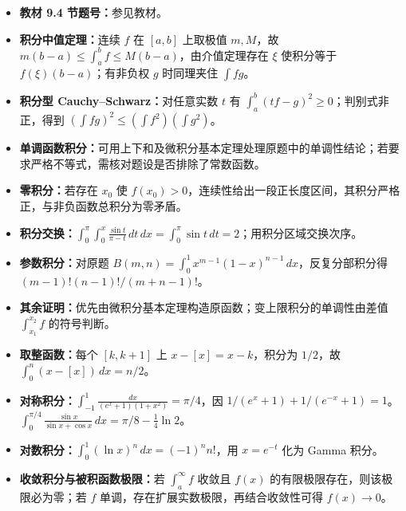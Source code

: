 \begin{itemize}
\item \textbf{教材 9.4 节题号：}参见教材。
\item \textbf{积分中值定理：}连续 $f$ 在 $[a,b]$ 上取极值 $m,M$，故 $m(b-a)\le\int_a^b f\le M(b-a)$，由介值定理存在 $\xi$ 使积分等于 $f(\xi)(b-a)$；有非负权 $g$ 时同理夹住 $\int fg$。
\item \textbf{积分型 Cauchy--Schwarz：}对任意实数 $t$ 有 $\int_a^b(tf-g)^2\ge0$；判别式非正，得到 $(\int fg)^2\le(\int f^2)(\int g^2)$。
\item \textbf{单调函数积分：}可用上下和及微积分基本定理处理原题中的单调性结论；若要求严格不等式，需核对题设是否排除了常数函数。
\end{itemize}

\begin{itemize}
\item \textbf{零积分：}若存在 $x_0$ 使 $f(x_0)>0$，连续性给出一段正长度区间，其积分严格正，与非负函数总积分为零矛盾。
\item \textbf{积分交换：}$\int_0^\pi\int_0^x\frac{\sin t}{\pi-t}\,dt\,dx=\int_0^\pi\sin t\,dt=2$；用积分区域交换次序。
\item \textbf{参数积分：}对原题 $B(m,n)=\int_0^1x^{m-1}(1-x)^{n-1}\,dx$，反复分部积分得 $(m-1)!(n-1)!/(m+n-1)!$。
\item \textbf{其余证明：}优先由微积分基本定理构造原函数；变上限积分的单调性由差值 $\int_{x_1}^{x_2}f$ 的符号判断。
\end{itemize}

\begin{itemize}
\item \textbf{取整函数：}每个 $[k,k+1]$ 上 $x-[x]=x-k$，积分为 $1/2$，故 $\int_0^n(x-[x])\,dx=n/2$。
\item \textbf{对称积分：}$\int_{-1}^1\!\frac{dx}{(e^x+1)(1+x^2)}=\pi/4$，因 $1/(e^x+1)+1/(e^{-x}+1)=1$。$\int_0^{\pi/4}\!\frac{\sin x}{\sin x+\cos x}\,dx=\pi/8-\tfrac14\ln2$。
\item \textbf{对数积分：}$\int_0^1(\ln x)^n\,dx=(-1)^n n!$，用 $x=e^{-t}$ 化为 Gamma 积分。
\item \textbf{收敛积分与被积函数极限：}若 $\int_a^\infty f$ 收敛且 $f(x)$ 的有限极限存在，则该极限必为零；若 $f$ 单调，存在扩展实数极限，再结合收敛性可得 $f(x)\to0$。
\end{itemize}

